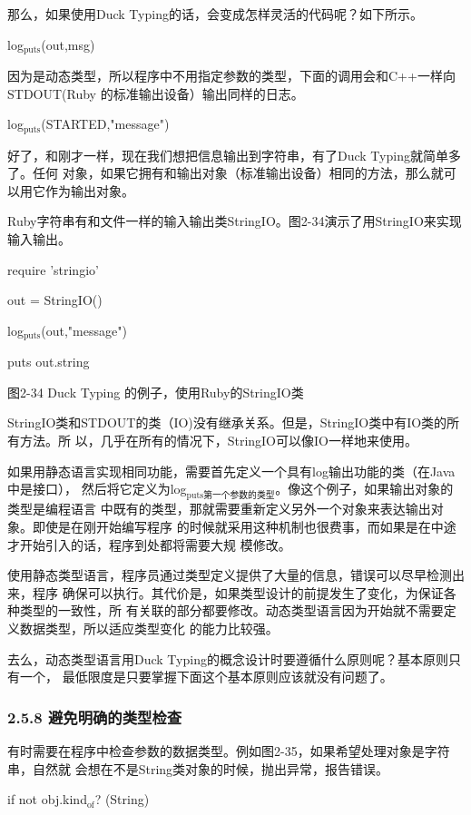 \documentclass[11pt]{ctexart}
\begin{document}
那么，如果使用Duck Typing的话，会变成怎样灵活的代码呢？如下所示。

log\(_{\text{puts}}\)(out,msg)

因为是动态类型，所以程序中不用指定参数的类型，下面的调用会和C++一样向STDOUT(Ruby
的标准输出设备）输出同样的日志。

log\(_{\text{puts}}\)(STARTED,"message")

好了，和刚才一样，现在我们想把信息输出到字符串，有了Duck Typing就简单多了。任何
对象，如果它拥有和输出对象（标准输出设备）相同的方法，那么就可以用它作为输出对象。

Ruby字符串有和文件一样的输入输出类StringIO。图2-34演示了用StringIO来实现输入输出。

require 'stringio'

out = StringIO()

log\(_{\text{puts}}\)(out,"message")

puts out.string

图2-34 Duck Typing 的例子，使用Ruby的StringIO类

StringIO类和STDOUT的类（IO)没有继承关系。但是，StringIO类中有IO类的所有方法。所
以，几乎在所有的情况下，StringIO可以像IO一样地来使用。

如果用静态语言实现相同功能，需要首先定义一个具有log输出功能的类（在Java中是接口），
然后将它定义为log\(_{\text{puts第一个参数的类型}}\)。像这个例子，如果输出对象的类型是编程语言
中既有的类型，那就需要重新定义另外一个对象来表达输出对象。即使是在刚开始编写程序
的时候就采用这种机制也很费事，而如果是在中途才开始引入的话，程序到处都将需要大规
模修改。

使用静态类型语言，程序员通过类型定义提供了大量的信息，错误可以尽早检测出来，程序
确保可以执行。其代价是，如果类型设计的前提发生了变化，为保证各种类型的一致性，所
有关联的部分都要修改。动态类型语言因为开始就不需要定义数据类型，所以适应类型变化
的能力比较强。

去么，动态类型语言用Duck Typing的概念设计时要遵循什么原则呢？基本原则只有一个，
最低限度是只要掌握下面这个基本原则应该就没有问题了。
\subsubsection{2.5.8 避免明确的类型检查}
\label{sec:org62d3037}

有时需要在程序中检查参数的数据类型。例如图2-35，如果希望处理对象是字符串，自然就
会想在不是String类对象的时候，抛出异常，报告错误。

if not obj.kind\(_{\text{of}}\)? (String)
\end{document}
